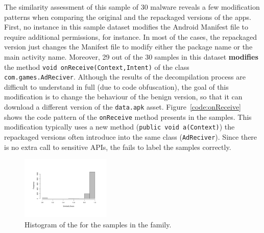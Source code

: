 The similarity assessment of this sample of 30 \gps malware reveals a few modification patterns when comparing the original and the
repackaged versions of the apps. First, no instance in this \gps sample dataset
modifies the Android Manifest file to require additional permissions, for instance.
In most of the cases, the repackaged version just changes the Manifest file to modify either
the package name or the main activity name. Moreover, 29 out of the 30 samples in this dataset  {\bf modifies} the 
method \texttt{void onReceive(Context,Intent)} of the class \texttt{com.games.AdReciver}. Although the results of the
decompilation process are difficult to understand in full (due to code obfuscation),
the goal of this modification is to change the behaviour of the benign version, so that it can
download a different version of the \texttt{data.apk} 
asset. Figure~\ref{code:onReceive} shows
the code pattern of the \texttt{onReceive} method presents in the samples. This modification
typically uses a new method (\texttt{public void a(Context)})
the repackaged versions often introduce into the same class (\texttt{AdReciver}).
Since there is no extra call to sensitive APIs, the \mas fails to label
the \gps samples correctly. 

\begin{figure}
\begin{center}
    \includegraphics[width=0.38\textwidth]{images/similarityGappusin_V2.pdf}
  \end{center}
  \caption{Histogram of the \sscore for the samples in the \gps family.}
  \label{fig:hist-gappusin}
\end{figure}  

